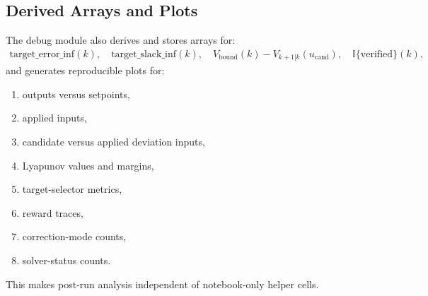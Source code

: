 \documentclass[11pt]{article}
\begin{document}
\subsection{Derived Arrays and Plots}
The debug module also derives and stores arrays for:
\begin{align}
\text{target\_error\_inf}(k),\quad
\text{target\_slack\_inf}(k),\quad
V_{\mathrm{bound}}(k)-V_{k+1|k}(u_{\mathrm{cand}}), \quad
\mathbb{I}\{\text{verified}\}(k),
\end{align}
and generates reproducible plots for:
\begin{enumerate}[leftmargin=*]
\item outputs versus setpoints,
\item applied inputs,
\item candidate versus applied deviation inputs,
\item Lyapunov values and margins,
\item target-selector metrics,
\item reward traces,
\item correction-mode counts,
\item solver-status counts.
\end{enumerate}
This makes post-run analysis independent of notebook-only helper cells.
\end{document}
